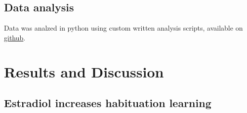 \documentclass[9pt,lineno]{RandlettLab_elife}
\begin{document}
\subsection{Data analysis}

Data was analzed in python using custom written analysis scripts, available on \href{https://github.com/owenrandlett/2025\_HabEstrogen}{github}. 

\newpage
\section{Results and Discussion}

\subsection{Estradiol increases habituation learning}
\end{document}
